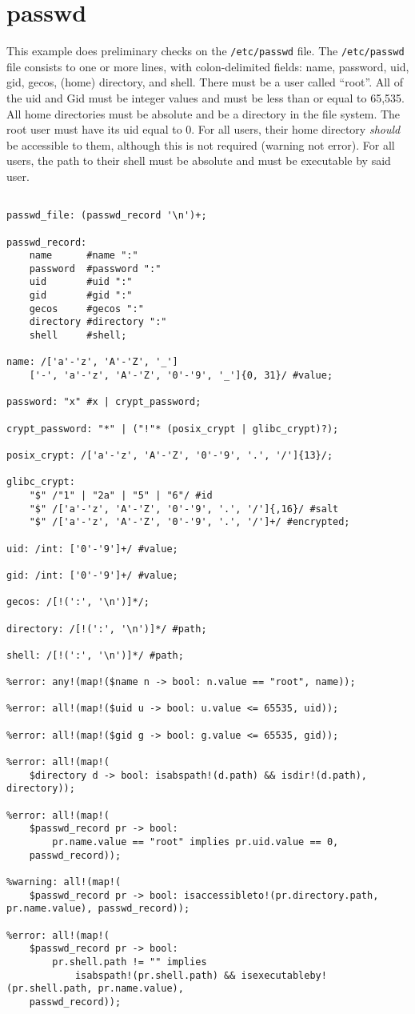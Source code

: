 
\section{passwd}
{
This example does preliminary checks on the \texttt{/etc/passwd} file.
The \texttt{/etc/passwd} file consists to one or more lines,
with colon-delimited fields: name, password, uid, gid, gecos, (home) directory,
and shell. There must be a user called ``root''.
All of the uid and Gid must be integer values
and must be less than or equal to 65,535.
All home directories must be absolute and be a directory in the file system.
The root user must have its uid equal to 0.
For all users, their home directory \textit{should} be accessible to them, although
this is not required (warning not error).
For all users, the path to their shell must be absolute and must be executable
by said user.

\begin{lstlisting}[texcl=true, language=MAIA]
%parse: "/etc/passwd" as passwd_file;

passwd_file: (passwd_record '\n')+;

passwd_record:
	name      #name ":"
	password  #password ":"
	uid       #uid ":"
	gid       #gid ":"
	gecos     #gecos ":"
	directory #directory ":"
	shell     #shell;

name: /['a'-'z', 'A'-'Z', '_']
	['-', 'a'-'z', 'A'-'Z', '0'-'9', '_']{0, 31}/ #value;

password: "x" #x | crypt_password;

crypt_password: "*" | ("!"* (posix_crypt | glibc_crypt)?);

posix_crypt: /['a'-'z', 'A'-'Z', '0'-'9', '.', '/']{13}/;

glibc_crypt:
	"$" /"1" | "2a" | "5" | "6"/ #id
	"$" /['a'-'z', 'A'-'Z', '0'-'9', '.', '/']{,16}/ #salt
	"$" /['a'-'z', 'A'-'Z', '0'-'9', '.', '/']+/ #encrypted;

uid: /int: ['0'-'9']+/ #value;

gid: /int: ['0'-'9']+/ #value;

gecos: /[!(':', '\n')]*/;

directory: /[!(':', '\n')]*/ #path;

shell: /[!(':', '\n')]*/ #path;

%error: any!(map!($name n -> bool: n.value == "root", name));

%error: all!(map!($uid u -> bool: u.value <= 65535, uid));

%error: all!(map!($gid g -> bool: g.value <= 65535, gid));

%error: all!(map!(
	$directory d -> bool: isabspath!(d.path) && isdir!(d.path), directory));

%error: all!(map!(
	$passwd_record pr -> bool:
		pr.name.value == "root" implies pr.uid.value == 0,
	passwd_record));

%warning: all!(map!(
	$passwd_record pr -> bool: isaccessibleto!(pr.directory.path, pr.name.value), passwd_record));

%error: all!(map!(
	$passwd_record pr -> bool:
		pr.shell.path != "" implies
			isabspath!(pr.shell.path) && isexecutableby!(pr.shell.path, pr.name.value),
	passwd_record));

\end{lstlisting}
}

